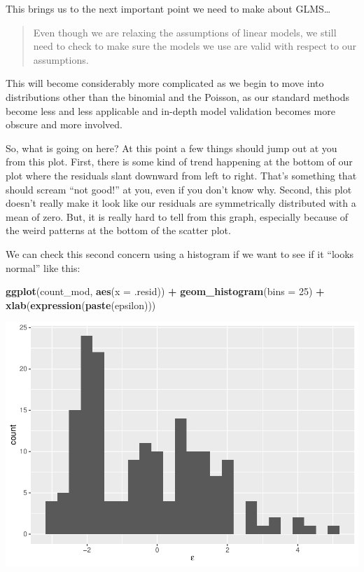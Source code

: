 \documentclass[
]{book}
\newenvironment{Shaded}{\begin{snugshade}}{\end{snugshade}}
\newcommand{\DataTypeTok}[1]{\textcolor[rgb]{0.13,0.29,0.53}{#1}}
\newcommand{\DecValTok}[1]{\textcolor[rgb]{0.00,0.00,0.81}{#1}}
\newcommand{\KeywordTok}[1]{\textcolor[rgb]{0.13,0.29,0.53}{\textbf{#1}}}
\newcommand{\NormalTok}[1]{#1}
\newcommand{\OperatorTok}[1]{\textcolor[rgb]{0.81,0.36,0.00}{\textbf{#1}}}
\newcommand{\StringTok}[1]{\textcolor[rgb]{0.31,0.60,0.02}{#1}}
\begin{document}
This brings us to the next important point we need to make about GLMS\ldots{}

\begin{quote}
Even though we are relaxing the assumptions of linear models, we still need to check to make sure the models we use are valid with respect to our assumptions.
\end{quote}

This will become considerably more complicated as we begin to move into distributions other than the binomial and the Poisson, as our standard methods become less and less applicable and in-depth model validation becomes more obscure and more involved.

So, what is going on here? At this point a few things should jump out at you from this plot. First, there is some kind of trend happening at the bottom of our plot where the residuals slant downward from left to right. That's something that should scream ``not good!'' at you, even if you don't know why. Second, this plot doesn't really make it look like our residuals are symmetrically distributed with a mean of zero. But, it is really hard to tell from this graph, especially because of the weird patterns at the bottom of the scatter plot.

We can check this second concern using a histogram if we want to see if it ``looks normal'' like this:

\begin{Shaded}
\begin{Highlighting}[]
\KeywordTok{ggplot}\NormalTok{(count_mod, }\KeywordTok{aes}\NormalTok{(}\DataTypeTok{x =}\NormalTok{ .resid)) }\OperatorTok{+}
\StringTok{  }\KeywordTok{geom_histogram}\NormalTok{(}\DataTypeTok{bins =} \DecValTok{25}\NormalTok{) }\OperatorTok{+}
\StringTok{  }\KeywordTok{xlab}\NormalTok{(}\KeywordTok{expression}\NormalTok{(}\KeywordTok{paste}\NormalTok{(epsilon)))}
\end{Highlighting}
\end{Shaded}

\includegraphics{worstr_files/figure-latex/unnamed-chunk-350-1.pdf}
\end{document}
